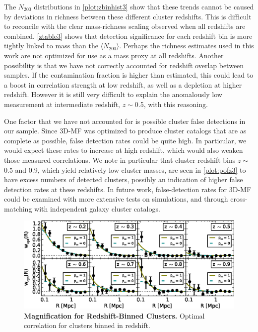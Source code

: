 The $N_{200}$ distributions in \autoref{plot:zbinhist3} show that these trends cannot be caused by deviations in richness between these different cluster redshifts. This is difficult to reconcile with the clear mass-richness scaling observed when all redshifts are combined. \autoref{ztable3} shows that detection significance for each redshift bin is more tightly linked to mass than the $\langle N_{200} \rangle$. Perhaps the richness estimates used in this work are not optimized for use as a mass proxy at all redshifts. Another possibility is that we have not correctly accounted for redshift overlap between samples. If the contamination fraction is higher than estimated, this could lead to a boost in correlation strength at low redshift, as well as a depletion at higher redshift. However it is still very difficult to explain the anomalously low measurement at intermediate redshift, $z \sim$0.5, with this reasoning.

One factor that we have not accounted for is possible cluster false detections in our sample. Since \ac{3D-MF} was optimized to produce cluster catalogs that are as complete as possible, false detection rates could be quite high. In particular, we would expect these rates to increase at high redshift, which would also weaken those measured correlations. We note in particular that cluster redshift bins $z \sim$ 0.5 and 0.9, which yield relatively low cluster masses, are seen in \autoref{plot:pofz3} to have excess numbers of detected clusters, possibly an indication of higher false detection rates at these redshifts. In future work, false-detection rates for \ac{3D-MF} could be examined with more extensive tests on simulations, and through cross-matching with independent galaxy cluster catalogs.

\begin{figure}
\begin{center}
\includegraphics[scale=0.9]{plots_ch3/wopt_z_panels_U.eps}
\caption[Magnification for Redshift-Binned Clusters]{{\bf Magnification for Redshift-Binned Clusters.} Optimal correlation for clusters binned in redshift.}
\label{plot:zbinw3}
\end{center}
\end{figure}

